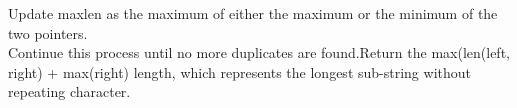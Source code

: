 \documentclass[preview]{standalone}
\begin{document}
Update maxlen as the maximum of either the maximum or the minimum of the two pointers.\\Continue this process until no more duplicates are found.Return the max(len(left, right) + max(right) length, which represents the longest sub-string without repeating character.\\
\end{document}
